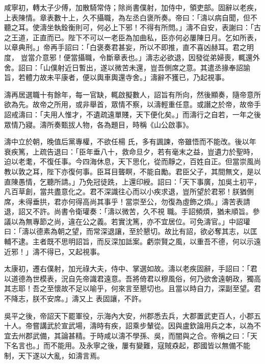 \begin{pinyinscope}
 咸寧初，轉太子少傅，加散騎常侍；除尚書僕射，加侍中，領吏部。固辭以老疾，上表陳情。章表數十上，久不攝職，為左丞白褒所奏。帝曰：「濤以病自聞，但不聽之耳。使濤坐執銓衡則可，何必上下邪！不得有所問。」濤不自安，表謝曰：「古之王道，正直而已。陛下不可以一老臣為加曲私，臣亦何必屢陳日月。乞如所表，以章典刑。」帝再手詔曰：「白褒奏君甚妄，所以不即推，直不喜凶赫耳。君之明度，
 豈當介意邪！便當攝職，令斷章表也。」濤志必欲退，因發從弟婦喪，輒還外舍。詔曰：「山僕射近日暫出，遂以微苦未還，豈吾側席之意。其遣丞掾奉詔諭旨，若體力故未平康者，便以輿車輿還寺舍。」濤辭不獲已，乃起視事。



 濤再居選職十有餘年，每一官缺，輒啟擬數人，詔旨有所向，然後顯奏，隨帝意所欲為先。故帝之所用，或非舉首，眾情不察，以濤輕重任意。或譖之於帝，故帝手詔戒濤曰：「夫用人惟才，不遺疏遠單賤，天下便化矣。」而濤行之自若，一年之後眾情乃寢。濤所奏甄拔人物，各為題目，時稱《山公啟事》。



 濤中立於朝，晚值后黨專權，不欲任楊
 氏，多有諷諫，帝雖悟而不能改。後以年衰疾篤，上疏告退曰：「臣年垂八十，救命旦夕，若有毫末之益，豈遺力於聖時，迫以老耄，不復任事。今四海休息，天下思化，從而靜之，百姓自正。但當崇風尚教以敦之耳，陛下亦復何事。臣耳目聾瞑，不能自勵。君臣父子，其間無文，是以直陳愚情，乞聽所請。」乃免冠徒跣，上還印綬。詔曰：「天下事廣，加吳土初平，凡百草創，當共盡意化之。君不深識往心而以小疾求退，豈所望於君邪！朕猶側席，未得垂拱，君亦何得高尚其事乎！當崇至公，勿復為虛飾之煩。」濤苦表請退，詔又不許。尚書令衛瓘奏：「濤以微苦，久不視
 職。手詔頻煩，猶未順旨。參議以為無專節之尚，違在公之義。若實沈篤，亦不宜居位。可免濤官。」中詔瓘曰：「濤以德素為朝之望，而常深退讓，至於懇切。故比有詔，欲必奪其志，以匡輔不逮。主者既不思明詔旨，而反深加詆案。虧崇賢之風，以重吾不德，何以示遠近邪！」濤不得已，又起視事。



 太康初，遷右僕射，加光祿大夫，侍中、掌選如故。濤以老疾固辭，手詔曰：「君以道德為世模表，況自先帝識君遠意。吾將倚君以穆風俗，何乃欲舍遠朝政，獨高其志耶！吾之至懷故不足以喻乎，何來言至懇切也。且當以時自力，深副至望。君不降志，朕不安席。」濤又上
 表固讓，不許。



 吳平之後，帝詔天下罷軍役，示海內大安，州郡悉去兵，大郡置武吏百人，小郡五十人。帝嘗講武於宣武場，濤時有疾，詔乘步輦從。因與盧欽論用兵之本，以為不宜去州郡武備，其論甚精。于時咸以濤不學孫、吳，而闇與之合。帝稱之曰：「天下名言也。」而不能用。及永寧之後，屢有變難，寇賊猋起，郡國皆以無備不能制，天下遂以大亂，如濤言焉。




\end{pinyinscope}
